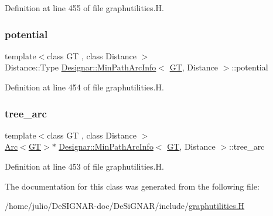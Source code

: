Definition at line 455 of file graphutilities.\+H.

\mbox{\label{class_designar_1_1_min_path_arc_info_ae53cddd12f7488ab3daf3711963b533d}} 
\subsubsection{\texorpdfstring{potential}{potential}}
{\footnotesize\ttfamily template$<$class GT , class Distance $>$ \\
Distance\+::\+Type \hyperlink{class_designar_1_1_min_path_arc_info}{Designar\+::\+Min\+Path\+Arc\+Info}$<$ \hyperlink{demo-buildgraph_8_c_a3001c40d2c31ca87ed96cd7d1334a55e}{GT}, Distance $>$\+::potential}



Definition at line 454 of file graphutilities.\+H.

\mbox{\label{class_designar_1_1_min_path_arc_info_a2f5c165e547c75ec582dd3724a93137c}} 
\subsubsection{\texorpdfstring{tree\+\_\+arc}{tree\_arc}}
{\footnotesize\ttfamily template$<$class GT , class Distance $>$ \\
\hyperlink{namespace_designar_a3f55fb5513d62ff47cbc8f72b8e95d6f}{Arc}$<$\hyperlink{demo-buildgraph_8_c_a3001c40d2c31ca87ed96cd7d1334a55e}{GT}$>$$\ast$ \hyperlink{class_designar_1_1_min_path_arc_info}{Designar\+::\+Min\+Path\+Arc\+Info}$<$ \hyperlink{demo-buildgraph_8_c_a3001c40d2c31ca87ed96cd7d1334a55e}{GT}, Distance $>$\+::tree\+\_\+arc}



Definition at line 453 of file graphutilities.\+H.



The documentation for this class was generated from the following file\+:\begin{DoxyCompactItemize}
\item 
/home/julio/\+De\+S\+I\+G\+N\+A\+R-\/doc/\+De\+Si\+G\+N\+A\+R/include/\hyperlink{graphutilities_8_h}{graphutilities.\+H}\end{DoxyCompactItemize}
